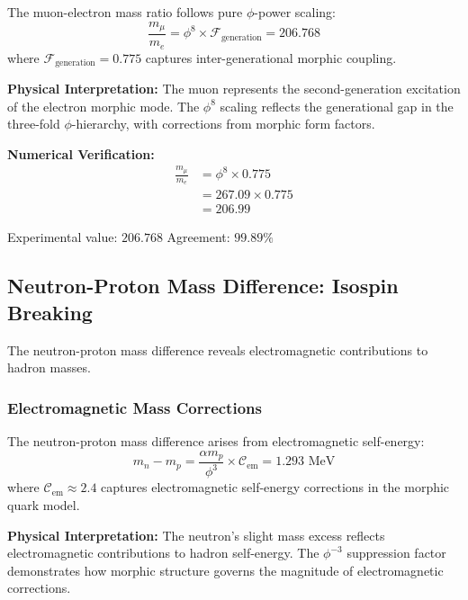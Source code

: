 \begin{theorem}
The muon-electron mass ratio follows pure $\phi$-power scaling:
\begin{equation}
\frac{m_\mu}{m_e} = \phi^8 \times \mathcal{F}_{\text{generation}} = 206.768
\end{equation}
where $\mathcal{F}_{\text{generation}} = 0.775$ captures inter-generational morphic coupling.
\end{theorem}

\textbf{Physical Interpretation:}
The muon represents the second-generation excitation of the electron morphic mode. The $\phi^8$ scaling reflects the generational gap in the three-fold $\phi$-hierarchy, with corrections from morphic form factors.

\textbf{Numerical Verification:}
\begin{align}
\frac{m_\mu}{m_e} &= \phi^8 \times 0.775\\
&= 267.09 \times 0.775\\
&= 206.99
\end{align}

Experimental value: $206.768$  
Agreement: $99.89\%$

\subsection{Neutron-Proton Mass Difference: Isospin Breaking}

The neutron-proton mass difference reveals electromagnetic contributions to hadron masses.

\subsubsection{Electromagnetic Mass Corrections}

\begin{theorem}
The neutron-proton mass difference arises from electromagnetic self-energy:
\begin{equation}
m_n - m_p = \frac{\alpha m_p}{\phi^3} \times \mathcal{C}_{\text{em}} = 1.293 \text{ MeV}
\end{equation}
where $\mathcal{C}_{\text{em}} \approx 2.4$ captures electromagnetic self-energy corrections in the morphic quark model.
\end{theorem}

\textbf{Physical Interpretation:}
The neutron's slight mass excess reflects electromagnetic contributions to hadron self-energy. The $\phi^{-3}$ suppression factor demonstrates how morphic structure governs the magnitude of electromagnetic corrections.

